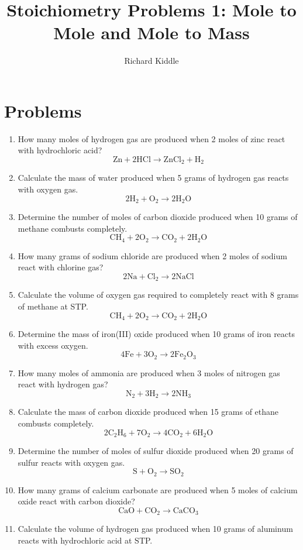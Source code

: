 \documentclass{article}
\title{Stoichiometry Problems 1: Mole to Mole and Mole to Mass}
\author{Richard Kiddle}
\date{}
\begin{document}
\maketitle

\section*{Problems}

\begin{enumerate}
\item How many moles of hydrogen gas are produced when 2 moles of zinc react with hydrochloric acid?
\[
\text{Zn} + 2\text{HCl} \rightarrow \text{ZnCl}_2 + \text{H}_2
\]
\item Calculate the mass of water produced when 5 grams of hydrogen gas reacts with oxygen gas.
\[
2\text{H}_2 + \text{O}_2 \rightarrow 2\text{H}_2\text{O}
\]
\item Determine the number of moles of carbon dioxide produced when 10 grams of methane combusts completely.
\[
\text{CH}_4 + 2\text{O}_2 \rightarrow \text{CO}_2 + 2\text{H}_2\text{O}
\]
\item How many grams of sodium chloride are produced when 2 moles of sodium react with chlorine gas?
\[
2\text{Na} + \text{Cl}_2 \rightarrow 2\text{NaCl}
\]
\item Calculate the volume of oxygen gas required to completely react with 8 grams of methane at STP.
\[
\text{CH}_4 + 2\text{O}_2 \rightarrow \text{CO}_2 + 2\text{H}_2\text{O}
\]
\item Determine the mass of iron(III) oxide produced when 10 grams of iron reacts with excess oxygen.
\[
4\text{Fe} + 3\text{O}_2 \rightarrow 2\text{Fe}_2\text{O}_3
\]
\item How many moles of ammonia are produced when 3 moles of nitrogen gas react with hydrogen gas?
\[
\text{N}_2 + 3\text{H}_2 \rightarrow 2\text{NH}_3
\]
\item Calculate the mass of carbon dioxide produced when 15 grams of ethane combusts completely.
\[
2\text{C}_2\text{H}_6 + 7\text{O}_2 \rightarrow 4\text{CO}_2 + 6\text{H}_2\text{O}
\]
\item Determine the number of moles of sulfur dioxide produced when 20 grams of sulfur reacts with oxygen gas.
\[
\text{S} + \text{O}_2 \rightarrow \text{SO}_2
\]
\item How many grams of calcium carbonate are produced when 5 moles of calcium oxide react with carbon dioxide?
\[
\text{CaO} + \text{CO}_2 \rightarrow \text{CaCO}_3
\]
\item Calculate the volume of hydrogen gas produced when 10 grams of aluminum reacts with hydrochloric acid at STP.

\end{enumerate}
\end{document}

